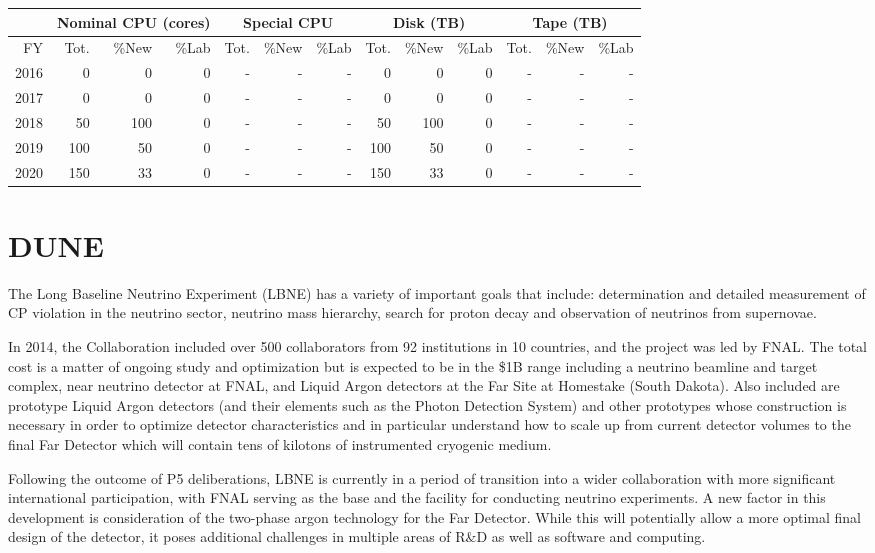 \documentclass[pdftex,12pt,letter]{article}
\begin{document}
\begin{tabular}[h]{|r || r|r|r || r|r|r || r|r|r || r|r|r ||}
  \hline
   & \multicolumn{3}{c||}{Nominal CPU (cores)} & \multicolumn{3}{c||}{Special CPU} & \multicolumn{3}{c||}{Disk (TB)} & \multicolumn{3}{c||}{Tape (TB)} \\
   \hline
  FY & Tot. & \%New & \%Lab & Tot. & \%New & \%Lab & Tot. & \%New & \%Lab & Tot. & \%New & \%Lab \\
  \hline
  2016 &0 &0 &0 &   -& -& -& 0& 0& 0&- &- &- \\
  \hline
  2017 &0 &0 &0 &   -& -& -& 0& 0& 0&- &- &- \\
  \hline
  2018 &50 & 100 &0& -& -& -&  50 & 100 & 0 &- &- &-  \\
  \hline
  2019 &100 & 50& 0& -& -& -& 100 & 50 & 0 &- &- &-  \\
  \hline
  2020 &150 & 33& 0& -& -& -& 150 & 33 & 0 &- &- &-  \\
  \hline
\end{tabular}


\pagebreak
\section{DUNE}

The Long Baseline Neutrino Experiment (LBNE) has a variety of important goals that
include:
determination and detailed measurement of CP violation in the neutrino sector,
neutrino mass hierarchy,
search for proton decay and
observation of neutrinos from supernovae.


In 2014, the Collaboration included over 500 collaborators from 92
institutions in 10 countries, and the project was led by FNAL.
The total cost is a matter of ongoing study and optimization but is
expected to be in the \$1B range including a neutrino beamline and
target complex, near neutrino detector at FNAL, and Liquid Argon
detectors at the Far Site at Homestake (South Dakota). Also included
are prototype Liquid Argon detectors (and their elements such as the
Photon Detection System) and other prototypes whose construction is
necessary in order to optimize detector characteristics and in
particular understand how to scale up from current detector volumes to
the final Far Detector which will contain tens of kilotons of
instrumented cryogenic medium.

Following the outcome of P5 deliberations, LBNE is currently in a
period of transition into a wider collaboration with more significant
international participation, with FNAL serving as the base and the
facility for conducting neutrino experiments.
A new factor in this development is consideration of the two-phase
argon technology for the Far Detector. While this will potentially
allow a more optimal final design of the detector, it poses additional
challenges in multiple areas of R\&D as well as software and
computing.
\end{document}
